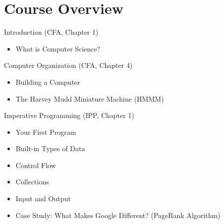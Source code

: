 \documentclass[8pt,a4paper,compress]{beamer}
\begin{document}
\section{Course Overview}

\begin{frame}[fragile]
\pause

Introduction (CFA, Chapter 1)
\begin{itemize}
\item What is Computer Science?
\end{itemize}

\pause
\bigskip

Computer Organization (CFA, Chapter 4)
\begin{itemize}
\item Building a Computer
\item The Harvey Mudd Miniature Machine (HMMM)
\end{itemize}

\pause
\bigskip

Imperative Programming (IPP, Chapter 1)
\begin{itemize}
\item Your First Program
\item Built-in Types of Data
\item Control Flow
\item Collections
\item Input and Output
\item Case Study: What Makes Google Different? (PageRank Algorithm)
\end{itemize}
\end{frame}
\end{document}
